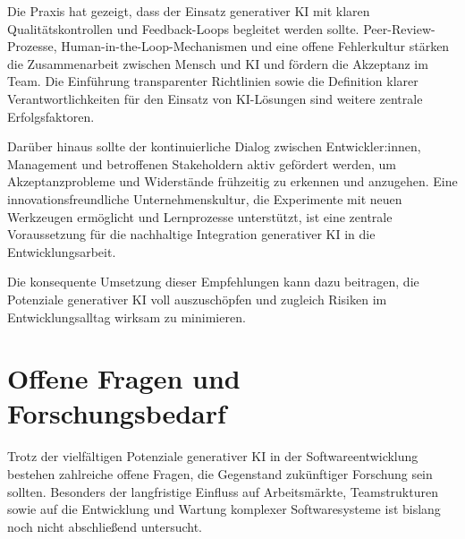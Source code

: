 Die Praxis hat gezeigt, dass der Einsatz generativer KI mit klaren
Qualitätskontrollen und Feedback-Loops begleitet werden sollte.
Peer-Review-Prozesse, Human-in-the-Loop-Mechanismen und eine offene
Fehlerkultur stärken die Zusammenarbeit zwischen Mensch und KI und fördern die
Akzeptanz im Team. Die Einführung transparenter Richtlinien sowie die
Definition klarer Verantwortlichkeiten für den Einsatz von KI-Lösungen sind
weitere zentrale Erfolgsfaktoren.

Darüber hinaus sollte der kontinuierliche Dialog zwischen Entwickler:innen,
Management und betroffenen Stakeholdern aktiv gefördert werden, um
Akzeptanzprobleme und Widerstände frühzeitig zu erkennen und anzugehen. Eine
innovationsfreundliche Unternehmenskultur, die Experimente mit neuen Werkzeugen
ermöglicht und Lernprozesse unterstützt, ist eine zentrale Voraussetzung für
die nachhaltige Integration generativer KI in die Entwicklungsarbeit.

Die konsequente Umsetzung dieser Empfehlungen kann dazu beitragen, die
Potenziale generativer KI voll auszuschöpfen und zugleich Risiken im
Entwicklungsalltag wirksam zu minimieren.


\section{Offene Fragen und Forschungsbedarf}

Trotz der vielfältigen Potenziale generativer KI in der Softwareentwicklung
bestehen zahlreiche offene Fragen, die Gegenstand zukünftiger Forschung sein
sollten. Besonders der langfristige Einfluss auf Arbeitsmärkte, Teamstrukturen
sowie auf die Entwicklung und Wartung komplexer Softwaresysteme ist bislang
noch nicht abschließend untersucht.

